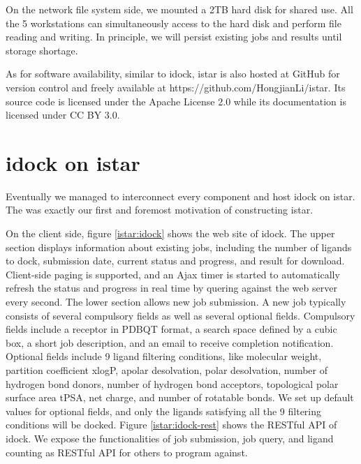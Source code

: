 On the network file system side, we mounted a 2TB hard disk for shared use. All the 5 workstations can simultaneously access to the hard disk and perform file reading and writing. In principle, we will persist existing jobs and results until storage shortage.

As for software availability, similar to idock, istar is also hosted at GitHub for version control and freely available at https://github.com/HongjianLi/istar. Its source code is licensed under the Apache License 2.0 while its documentation is licensed under CC BY 3.0.

\section{idock on istar}

Eventually we managed to interconnect every component and host idock \citep{1153} on istar. The was exactly our first and foremost motivation of constructing istar.

On the client side, figure \ref{istar:idock} shows the web site of idock. The upper section displays information about existing jobs, including the number of ligands to dock, submission date, current status and progress, and result for download. Client-side paging is supported, and an Ajax timer is started to automatically refresh the status and progress in real time by quering against the web server every second. The lower section allows new job submission. A new job typically consists of several compulsory fields as well as several optional fields. Compulsory fields include a receptor in PDBQT format, a search space defined by a cubic box, a short job description, and an email to receive completion notification. Optional fields include 9 ligand filtering conditions, like molecular weight, partition coefficient xlogP, apolar desolvation, polar desolvation, number of hydrogen bond donors, number of hydrogen bond acceptors, topological polar surface area tPSA, net charge, and number of rotatable bonds. We set up default values for optional fields, and only the ligands satisfying all the 9 filtering conditions will be docked. Figure \ref{istar:idock-rest} shows the RESTful API of idock. We expose the functionalities of job submission, job query, and ligand counting as RESTful API for others to program against.

